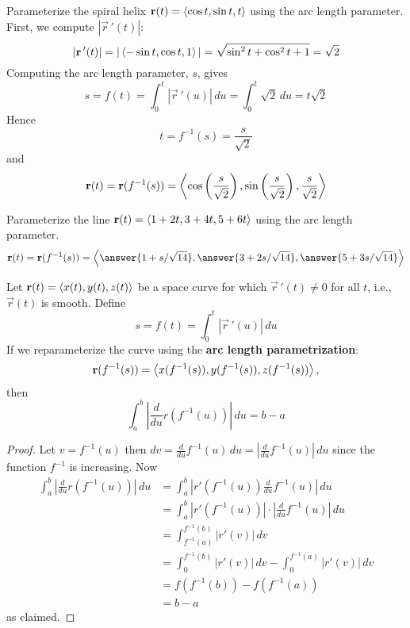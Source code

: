 \documentclass[handout]{ximera}
\begin{document}
\begin{example}[Example 2]
Parameterize the spiral helix $\mathbf r(t) = \left\langle \cos t, \sin t, t\right\rangle$ using the arc length parameter.\\
First, we compute $|\vec r\,'(t)|$:
\[
|\mathbf r\,'(t)| = |\left\langle -\sin t, \cos t, 1\right\rangle| = \sqrt{\sin^2 t + \cos^2 t + 1} = \sqrt 2
\]
Computing the arc length parameter, $s$, gives
\[
s = f(t) = \int_0^t |\vec r\,'(u)| \, du = \int_0^t \sqrt 2 \, du = t \sqrt 2
\]
Hence
\[
t = f^{-1}(s) = \frac{s}{\sqrt 2}
\]
and 
\[
\mathbf r(t) = \mathbf r(f^{-1}(s)) = \left\langle \cos \left(\frac{s}{\sqrt 2}\right), \sin \left(\frac{s}{\sqrt 2}\right),\frac{s}{\sqrt 2}\right\rangle
\]
\end{example}


\begin{problem}[Problem 2]
Parameterize the line $\mathbf r(t) =\left\langle 1+2t, 3+4t, 5+6t\right\rangle$ using the arc length parameter.
\[
\vec r(t) = \vec r(f^{-1}(s)) = \vector{\answer{1 + s/\sqrt{14}}, \answer{3 + 2s/\sqrt{14}}, \answer{5 + 3s/\sqrt{14}}}
\]
\end{problem}

\begin{proposition}
Let  $\mathbf r(t) = \left\langle x(t), y(t), z(t)\right\rangle $ be a space curve for which $\vec r\,'(t) \neq 0$ for all $t$, i.e., $\vec r(t)$ is smooth.
Define
\[
s = f(t) = \int_0^t |\vec r\,'(u)|\, du
\]
If we reparameterize the curve using the \textbf{arc length parametrization}:
\[
\mathbf r(f^{-1}(s)) = \left\langle x(f^{-1}(s)), y(f^{-1}(s)), z(f^{-1}(s))\right\rangle,
\]
then
\[
\int_a^b \left|\frac{d}{du} r(f^{-1} (u))\right| \, du = b-a
\]
\end{proposition}
\begin{proof}
Let $v = f^{-1}(u)$ then $dv = \frac{d}{du}f^{-1}(u) \, du = \left|\frac{d}{du}f^{-1}(u)\right| \, du$ since the function $f^{-1}$ is increasing.
Now
\begin{align*}
\int_a^b \left|\frac{d}{du} r(f^{-1} (u))\right| \, du &= \int_a^b \left| r'(f^{-1} (u))\frac{d}{du}f^{-1} (u)\right| \, du\\
&= \int_a^b | r'(f^{-1} (u))| \cdot \left|\frac{d}{du}f^{-1} (u)\right| \, du\\
&= \int_{f^{-1}(a)}^{f^{-1}(b)} | r'(v)| \, dv\\
&= \int_0^{f^{-1}(b)} | r'(v)| \, dv - \int_0^{f^{-1}(a)} | r'(v)| \, dv\\
&= f(f^{-1}(b)) - f(f^{-1}(a))\\
&= b -a
\end{align*}
as claimed.
\end{proof}
\end{document}
